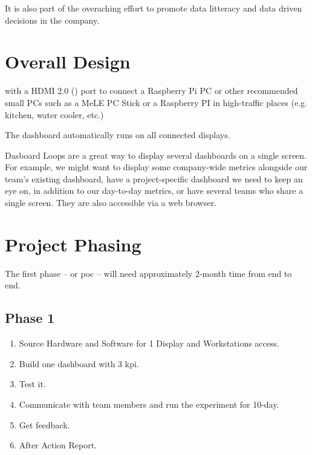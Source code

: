 \documentclass{tufte-handout}
\begin{document}
  \par It is also part of the overaching effort to promote data litteracy\cite{geckoboard-data-fallacies} and data driven decisions in the company.

\section{Overall Design}\label{sec:overall-design}
 with  a HDMI 2.0 () port to connect a Raspberry Pi PC or other recommended small PCs such as a  MeLE PC Stick\cite{Amazoncom_B08LYRQZ59} or a Raspberry PI\cite{Raspberry-5} in high-traffic places (e.g. kitchen, water cooler, etc.) 
\par The dashboard automatically runs on all connected displays. 
\par Dasboard Loops are a great way to display several dashboards on a single screen. For example, we might want to display some company-wide metrics alongside our team’s existing dashboard, have a project-specific dashboard we need to keep an eye on, in addition to our day-to-day metrics, or have several teams who share a single screen. They are also accessible via a web browser.

\section{Project Phasing}\label{sec:phasing}
 The first phase – or \gls{poc} – will need approximately 2-month time from end to end.

\subsection{Phase 1}
  \begin{enumerate}
    \item Source Hardware and Software for 1 Display and Workstations access.
    \item Build one dashboard with 3 \gls{kpi}.
    \item Test it.
    \item Communicate with team members and run the experiment for 10-day.
    \item Get feedback.
    \item After Action Report.
  \end{enumerate}
\end{document}
